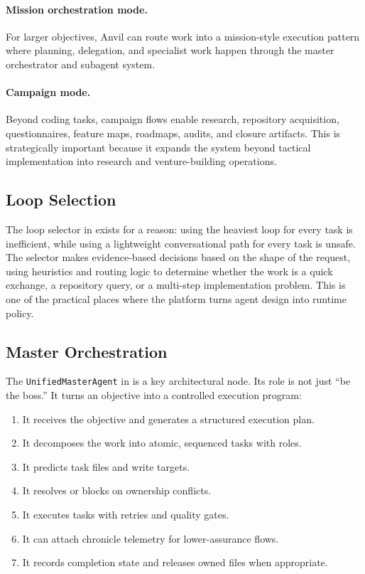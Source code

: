 \documentclass[11pt,a4paper]{article}
\begin{document}
\paragraph{Mission orchestration mode.}
For larger objectives, Anvil can route work into a mission-style execution pattern where planning, delegation, and specialist work happen through the master orchestrator and subagent system.

\paragraph{Campaign mode.}
Beyond coding tasks, campaign flows enable research, repository acquisition, questionnaires, feature maps, roadmaps, audits, and closure artifacts. This is strategically important because it expands the system beyond tactical implementation into research and venture-building operations.

\subsection{Loop Selection}
The loop selector in  exists for a reason: using the heaviest loop for every task is inefficient, while using a lightweight conversational path for every task is unsafe. The selector makes evidence-based decisions based on the shape of the request, using heuristics and routing logic to determine whether the work is a quick exchange, a repository query, or a multi-step implementation problem. This is one of the practical places where the platform turns agent design into runtime policy.

\subsection{Master Orchestration}
The \texttt{UnifiedMasterAgent} in  is a key architectural node. Its role is not just ``be the boss.'' It turns an objective into a controlled execution program:
\begin{enumerate}
    \item It receives the objective and generates a structured execution plan.
    \item It decomposes the work into atomic, sequenced tasks with roles.
    \item It predicts task files and write targets.
    \item It resolves or blocks on ownership conflicts.
    \item It executes tasks with retries and quality gates.
    \item It can attach chronicle telemetry for lower-assurance flows.
    \item It records completion state and releases owned files when appropriate.
\end{enumerate}
\end{document}
